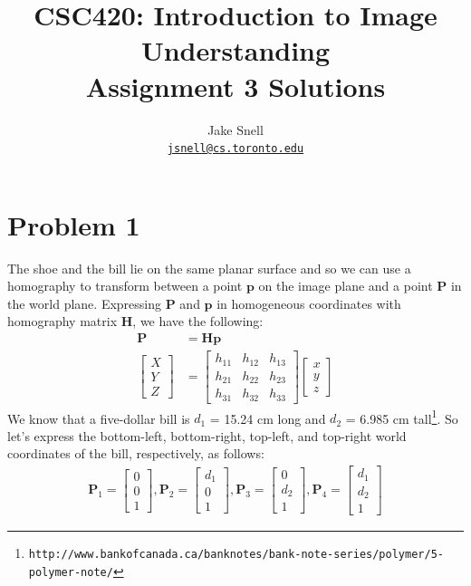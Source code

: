 \documentclass[12pt]{article}
\author{Jake Snell\\\href{mailto:jsnell@cs.toronto.edu}{\texttt{jsnell@cs.toronto.edu}}}
\title{CSC420: Introduction to Image Understanding\\Assignment 3 Solutions}
\begin{document}
\maketitle

\section*{Problem 1}

The shoe and the bill lie on the same planar surface and so we can use
a homography to transform between a point $\mathbf{p}$ on the image plane and
a point $\mathbf{P}$ in the world plane. Expressing $\mathbf{P}$ and
$\mathbf{p}$ in homogeneous coordinates with homography matrix $\mathbf{H}$, we
have the following:
%
\begin{align}
    \mathbf{P} &= \mathbf{H} \mathbf{p} \\
    \begin{bmatrix} X \\ Y \\ Z \end{bmatrix} &=
        \begin{bmatrix} h_{11} & h_{12} & h_{13} \\
                        h_{21} & h_{22} & h_{23} \\
                        h_{31} & h_{32} & h_{33} \end{bmatrix}
        \begin{bmatrix} x \\ y \\ z \end{bmatrix}
\end{align}
%
We know that a five-dollar bill is $d_1$ = 15.24 cm long and $d_2$ = 6.985 cm
tall\footnote{\texttt{http://www.bankofcanada.ca/banknotes/bank-note-series/polymer/5-polymer-note/}}.
So let's express the bottom-left, bottom-right, top-left, and top-right world
coordinates of the bill, respectively, as follows:
%
\begin{align}
    \mathbf{P}_1 = \begin{bmatrix}0 \\ 0 \\ 1\end{bmatrix},
    \mathbf{P}_2 = \begin{bmatrix}d_1 \\ 0 \\ 1\end{bmatrix},
    \mathbf{P}_3 = \begin{bmatrix}0 \\ d_2 \\ 1\end{bmatrix},
    \mathbf{P}_4 = \begin{bmatrix}d_1 \\ d_2 \\ 1\end{bmatrix}
\end{align}
\end{document}
